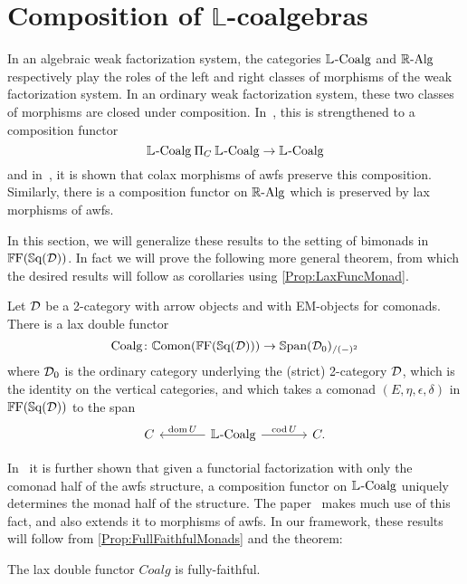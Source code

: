 
\chapter{Composition of $\mathbb{L}$-coalgebras}\label{Ch:Composition}

In an algebraic weak factorization system, the categories $\mathbb{L}_{}\text{-}\mathrm{Coalg}$ and $\mathbb{R}\text{-}\mathrm{Alg}$ respectively play the roles of the left and right classes of morphisms of the weak factorization system. In an ordinary weak factorization system, these two classes of morphisms are closed under composition. In~\cite{garner:soa}, this is strengthened to a composition functor
\[
	\mathbb{L}_{}\text{-}\mathrm{Coalg} \mathbin{\Pi}_C \mathbb{L}_{}\text{-}\mathrm{Coalg} \to \mathbb{L}_{}\text{-}\mathrm{Coalg}
\]
and in~\cite{riehl:nwfs-model}, it is shown that colax morphisms of awfs preserve this composition. Similarly, there is a composition functor on $\mathbb{R}\text{-}\mathrm{Alg}$ which is preserved by lax morphisms of awfs.

In this section, we will generalize these results to the setting of bimonads in $\mathbb{F}\mathrm{F}(\mathbb{S}\mathrm{q}(\mathcal{D}))$. In fact we will prove the following more general theorem, from which the desired results will follow as corollaries using \cref{Prop:LaxFuncMonad}.

\begin{theorem}\label{Thm:CoalgLaxFunctor}
	Let $\mathcal{D}$ be a 2-category with arrow objects and with EM-objects for comonads.
	There is a lax double functor
	\[
		\mathrm{Coalg}\colon \mathbb{C}\mathrm{omon}(\mathbb{F}\mathrm{F}(\mathbb{S}\mathrm{q}(\mathcal{D}))) \to \mathbb{S}\mathrm{pan}(\mathcal{D}_0)_{/(-)^2}
	\] 
	where $\mathcal{D}_0$ is the ordinary category underlying the (strict) 2-category $\mathcal{D}$, which is the identity on the vertical categories, and which takes a comonad $(E,\eta,\epsilon,\delta)$ in $\mathbb{F}\mathrm{F}(\mathbb{S}\mathrm{q}(\mathcal{D}))$ to the span
	\[
	\begin{tikzcd}[column sep=large]
		C & \LCoalg \lar[swap]{\dom U} \rar{\cod U} & C.
	\end{tikzcd}
	\]
\end{theorem}

In~\cite{garner:soa} it is further shown that given a functorial factorization with only the comonad half of the awfs structure, a composition functor on $\mathbb{L}_{}\text{-}\mathrm{Coalg}$ uniquely determines the monad half of the structure. The paper~\cite{riehl:nwfs-model} makes much use of this fact, and also extends it to morphisms of awfs. In our framework, these results will follow from \cref{Prop:FullFaithfulMonads} and the theorem:

\begin{theorem}\label{Thm:CoalgFullFaithful}
	The lax double functor $Coalg$ is fully-faithful.
\end{theorem}

